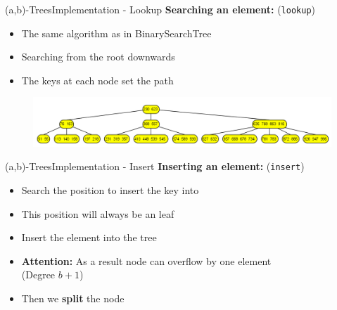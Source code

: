 \begin{frame}{(a,b)-Trees}{Implementation - Lookup}
  \textbf{Searching an element:} (\texttt{\color{MainA}lookup})
  \begin{itemize}
    \item<2->
      The same algorithm as in {\color{MainA}BinarySearchTree}
    \item<3->
      Searching from the root downwards
    \item<4->
      The keys at each node set the path
  \end{itemize}
  \begin{figure}[!h]
    \includegraphics[width=1\textwidth]{Images/(a,b)-Tree/(2,5)-Tree_Search.png}
  \end{figure}
\end{frame}


\begin{frame}{(a,b)-Trees}{Implementation - Insert}
  \textbf{Inserting an element:} (\texttt{\color{MainA}insert})
  \begin{itemize}
    \item<2->
      Search the position to insert the key into
    \item<3->
      This position will always be an leaf
    \item<4->
      Insert the element into the tree
    \item<5->
      \textbf{Attention:} As a result node can overflow by one element\\
      (Degree {\color{MainA}$b+1$})
    \item<6-> Then we \textbf{split} the node
  \end{itemize}
\end{frame}


